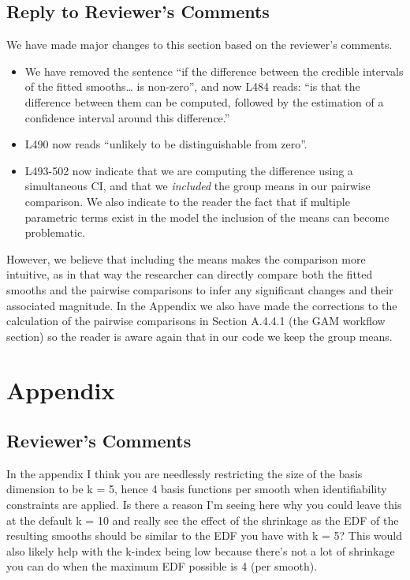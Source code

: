 \documentclass[
]{article}
\begin{document}
\hypertarget{section-9}{%
\subsection{\texorpdfstring{\textcolor{reviewersblue} {Reply to Reviewer's Comments}}{}}\label{section-9}}

We have made major changes to this section based on the reviewer's comments.

\begin{itemize}
\item
  We have removed the sentence ``if the difference between the credible intervals of the fitted smooths\ldots{} is non-zero'', and now L484 reads: ``is that the difference between them can be computed, followed by the estimation of a confidence interval around this difference.''
\item
  L490 now reads ``unlikely to be distinguishable from zero''.
\item
  L493-502 now indicate that we are computing the difference using a simultaneous CI, and that we \emph{included} the group means in our pairwise comparison. We also indicate to the reader the fact that if multiple parametric terms exist in the model the inclusion of the means can become problematic.
\end{itemize}

However, we believe that including the means makes the comparison more intuitive, as in that way the researcher can directly compare both the fitted smooths and the pairwise comparisons to infer any significant changes and their associated magnitude. In the Appendix we also have made the corrections to the calculation of the pairwise comparisons in Section A.4.4.1 (the GAM workflow section) so the reader is aware again that in our code we keep the group means.

\hypertarget{appendix}{%
\section{Appendix}\label{appendix}}

\hypertarget{reviewers-comments-9}{%
\subsection{Reviewer's Comments}\label{reviewers-comments-9}}

In the appendix I think you are needlessly restricting the size of the basis dimension to be k = 5, hence 4 basis functions per smooth when identifiability constraints are applied. Is there a reason I'm seeing here why you could leave this at the default k = 10 and really see the effect of the shrinkage as the EDF of the resulting smooths should be similar to the EDF you have with k = 5? This would also likely help with the k-index being low because there's not a lot of shrinkage you can do when the maximum EDF possible is 4 (per smooth).
\end{document}
